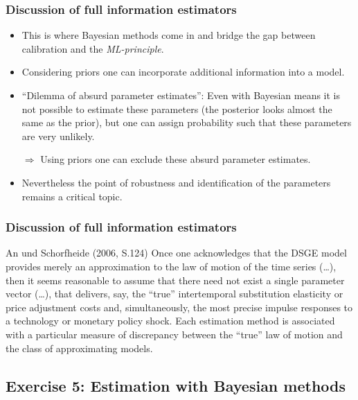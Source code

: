 \documentclass[handout]{beamer}  %
\begin{document}
\begin{frame}\frametitle{Discussion of full information estimators}
  \begin{itemize}
    \item This is where Bayesian methods come in and bridge the gap between calibration and the \emph{ML-principle}.
    \item Considering priors one can incorporate additional information into a model.
    \item \enquote{Dilemma of absurd parameter estimates}: Even with Bayesian means it is not possible to estimate these parameters (the posterior looks almost the same as the prior), but one can assign probability such that these parameters are very unlikely.
    \item[$\Rightarrow$] Using priors one can exclude these absurd parameter estimates.
    \item Nevertheless the point of robustness and identification of the parameters remains a critical topic.
  \end{itemize}
\end{frame}

\begin{frame}\frametitle{Discussion of full information estimators}

\begin{block}{An und Schorfheide (2006, S.124)}
Once one acknowledges that the DSGE model provides merely an approximation to
the law of motion of the time series (\dots), then it seems reasonable to
assume that there need not exist a single parameter vector (\dots), that
delivers, say, the \enquote{true} intertemporal substitution elasticity or
price adjustment costs and, simultaneously, the most precise impulse
responses to a technology or monetary policy shock. Each estimation method is
associated with a particular measure of discrepancy between the
\enquote{true} law of motion and the class of approximating models.
\end{block}
\end{frame}

\subsection{Exercise 5: Estimation with Bayesian methods}
\end{document}
